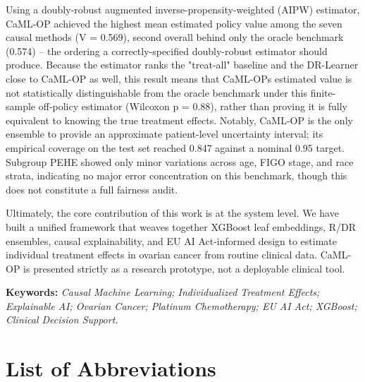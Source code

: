 Using a doubly-robust augmented inverse-propensity-weighted (AIPW) estimator, CaML-OP achieved the highest mean estimated policy value among the seven causal methods (V = 0.569), second overall behind only the oracle benchmark (0.574) -- the ordering a correctly-specified doubly-robust estimator should produce. Because the estimator ranks the "treat-all" baseline and the DR-Learner close to CaML-OP as well, this result means that CaML-OP\textquotesingle s estimated value is not statistically distinguishable from the oracle benchmark under this finite-sample off-policy estimator (Wilcoxon p = 0.88), rather than proving it is fully equivalent to knowing the true treatment effects. Notably, CaML-OP is the only ensemble to provide an approximate patient-level uncertainty interval; its empirical coverage on the test set reached 0.847 against a nominal 0.95 target. Subgroup PEHE showed only minor variations across age, FIGO stage, and race strata, indicating no major error concentration on this benchmark, though this does not constitute a full fairness audit.

Ultimately, the core contribution of this work is at the system level. We have built a unified framework that weaves together XGBoost leaf embeddings, R/DR ensembles, causal explainability, and EU AI Act-informed design to estimate individual treatment effects in ovarian cancer from routine clinical data. CaML-OP is presented strictly as a research prototype, not a deployable clinical tool.

\textbf{Keywords:} \emph{Causal Machine Learning; Individualized Treatment Effects; Explainable AI; Ovarian Cancer; Platinum Chemotherapy; EU AI Act; XGBoost; Clinical Decision Support.}

\chapter*{List of Abbreviations}

